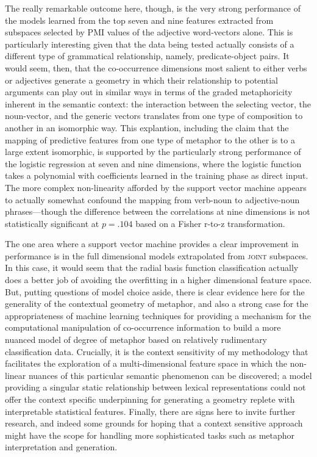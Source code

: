 The really remarkable outcome here, though, is the very strong performance of the models learned from the top seven and nine features extracted from subspaces selected by PMI values of the adjective word-vectors alone.  This is particularly interesting given that the data being tested actually consists of a different type of grammatical relationship, namely, predicate-object pairs.  It would seem, then, that the co-occurrence dimensions most salient to either verbs or adjectives generate a geometry in which their relationship to potential arguments can play out in similar ways in terms of the graded metaphoricity inherent in the semantic context: the interaction between the selecting vector, the noun-vector, and the generic vectors translates from one type of composition to another in an isomorphic way.  This explantion, including the claim that the mapping of predictive features from one type of metaphor to the other is to a large extent isomorphic, is supported by the particularly strong performance of the logistic regression at seven and nine dimensions, where the logistic function takes a polynomial with coefficients learned in the training phase as direct input.  The more complex non-linearity afforded by the support vector machine appears to actually somewhat confound the mapping from verb-noun to adjective-noun phrases---though the difference between the correlations at nine dimensions is not statistically significant at $p = .104$ based on a Fisher r-to-z transformation.

The one area where a support vector machine provides a clear improvement in performance is in the full dimensional models extrapolated from \textsc{joint} subspaces.  In this case, it would seem that the radial basis function classification actually does a better job of avoiding the overfitting in a higher dimensional feature space.  But, putting questions of model choice aside, there is clear evidence here for the generality of the contextual geometry of metaphor, and also a strong case for the appropriateness of machine learning techniques for providing a mechanism for the computational manipulation of co-occurrence information to build a more nuanced model of degree of metaphor based on relatively rudimentary classification data.  Crucially, it is the context sensitivity of my methodology that facilitates the exploration of a multi-dimensional feature space in which the non-linear nuances of this particular semantic phenomenon can be discovered; a model providing a singular static relationship between lexical representations could not offer the context specific underpinning for generating a geometry replete with interpretable statistical features.  Finally, there are signs here to invite further research, and indeed some grounds for hoping that a context sensitive approach might have the scope for handling more sophisticated tasks such as metaphor interpretation and generation.

